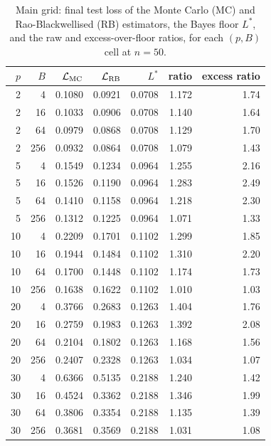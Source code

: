 \begin{table}[htbp]
  \centering
  \small
  \caption{Main grid: final test loss of the Monte Carlo (MC) and
  Rao-Blackwellised (RB) estimators, the Bayes floor $L^{*}$, and the
  raw and excess-over-floor ratios, for each $(p, B)$ cell at $n = 50$.}
  \label{tab:main-grid}
  \begin{tabular}{rr rrr rr}
    \toprule
    $p$ & $B$ & $\mathcal{L}_{\mathrm{MC}}$ & $\mathcal{L}_{\mathrm{RB}}$
        & $L^{*}$ & ratio & excess ratio \\
    \midrule
    2 & 4   & 0.1080 & 0.0921 & 0.0708 & 1.172 & 1.74 \\
    2 & 16  & 0.1033 & 0.0906 & 0.0708 & 1.140 & 1.64 \\
    2 & 64  & 0.0979 & 0.0868 & 0.0708 & 1.129 & 1.70 \\
    2 & 256 & 0.0932 & 0.0864 & 0.0708 & 1.079 & 1.43 \\
    \midrule
    5 & 4   & 0.1549 & 0.1234 & 0.0964 & 1.255 & 2.16 \\
    5 & 16  & 0.1526 & 0.1190 & 0.0964 & 1.283 & 2.49 \\
    5 & 64  & 0.1410 & 0.1158 & 0.0964 & 1.218 & 2.30 \\
    5 & 256 & 0.1312 & 0.1225 & 0.0964 & 1.071 & 1.33 \\
    \midrule
    10 & 4   & 0.2209 & 0.1701 & 0.1102 & 1.299 & 1.85 \\
    10 & 16  & 0.1944 & 0.1484 & 0.1102 & 1.310 & 2.20 \\
    10 & 64  & 0.1700 & 0.1448 & 0.1102 & 1.174 & 1.73 \\
    10 & 256 & 0.1638 & 0.1622 & 0.1102 & 1.010 & 1.03 \\
    \midrule
    20 & 4   & 0.3766 & 0.2683 & 0.1263 & 1.404 & 1.76 \\
    20 & 16  & 0.2759 & 0.1983 & 0.1263 & 1.392 & 2.08 \\
    20 & 64  & 0.2104 & 0.1802 & 0.1263 & 1.168 & 1.56 \\
    20 & 256 & 0.2407 & 0.2328 & 0.1263 & 1.034 & 1.07 \\
    \midrule
    30 & 4   & 0.6366 & 0.5135 & 0.2188 & 1.240 & 1.42 \\
    30 & 16  & 0.4524 & 0.3362 & 0.2188 & 1.346 & 1.99 \\
    30 & 64  & 0.3806 & 0.3354 & 0.2188 & 1.135 & 1.39 \\
    30 & 256 & 0.3681 & 0.3569 & 0.2188 & 1.031 & 1.08 \\
    \bottomrule
  \end{tabular}
\end{table}

